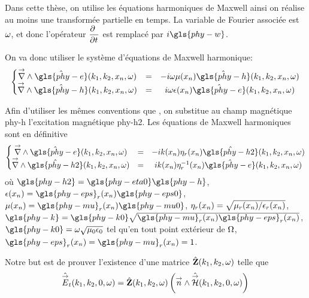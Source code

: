 Dans cette thèse, on utilise les équations harmoniques de Maxwell ainsi on réalise au moins une transformée partielle en temps. La variable de Fourier associée est \(\w\), et donc l'opérateur \(\ddr{t}{~}\) est remplacé par \(i\gls{phy-w}\).

On va donc utiliser le système d'équations de Maxwell harmonique:
\begin{equation}
    \left\lbrace
    \begin{matrix}
    \vrot \hat{\gls{phy-e}}(k_1,k_2,x_n,\w)  &=& -i \omega \mu(x_n) \hat{\gls{phy-h}}(k_1,k_2,x_n,\w)
    \\
    \vrot \hat{\gls{phy-h}}(k_1,k_2,x_n,\w)  &=& i \omega \eps(x_n) \hat{\gls{phy-e}}(k_1,k_2,x_n,\w)
    \end{matrix}
    \right.
    \label{eq:imp_fourier:intro:maxwell_harmonique}
\end{equation}

Afin d'utiliser les mêmes conventions que \cite{stupfel_implementation_2015}, on substitue au champ magnétique \gls{phy-h} l’excitation magnétique \gls{phy-h2}. Les équations de Maxwell harmoniques sont en définitive
\begin{equation}
    \left\lbrace
    \begin{matrix}
    \vrot \hat{\gls{phy-e}}(k_1,k_2,x_n,\w)  &=& -i k(x_n) \eta_r(x_n) \hat{\gls{phy-h2}}(k_1,k_2,x_n,\w)  \\
    \vrot \hat{\gls{phy-h2}}(k_1,k_2,x_n,\w)  &=& i k(x_n) \eta_r^{-1}(x_n) \hat{\gls{phy-e}}(k_1,k_2,x_n,\w)
    \end{matrix}
    \right.
    \label{eq:imp_fourier:intro:maxwell_harmonique:form_cea}
\end{equation}
où \(\gls{phy-h2} = \gls{phy-eta0} \gls{phy-h}\), \(\eps(x_n)=\gls{phy-eps}_r(x_n)\gls{phy-eps0}\), \(\mu(x_n)=\gls{phy-mu}_r(x_n)\gls{phy-mu0}\), \(\eta_r(x_n)=\sqrt{\mu_r(x_n)/\eps_r(x_n)}\), \(\gls{phy-k}=\gls{phy-k0}\sqrt{\gls{phy-mu}_r(x_n)\gls{phy-eps}_r(x_n)}\), \(\gls{phy-k0} = \w\sqrt{\mu_0\eps_0}\) tel qu'en tout point extérieur de \(\OO\), \(\gls{phy-eps}_r(x_n) = \gls{phy-mu}_r(x_n)= 1\).

Notre but est de prouver l'existence d'une matrice \(\hat\mZ(k_1,k_2,\w)\) telle que
\begin{equation*}
    \hat{\vE}_t(k_1,k_2,0,\w) =  \hat{\mZ}(k_1,k_2,\w) \left(\vn \pvect \hat{\vH}(k_1,k_2,0,\w) \right)
\end{equation*}

